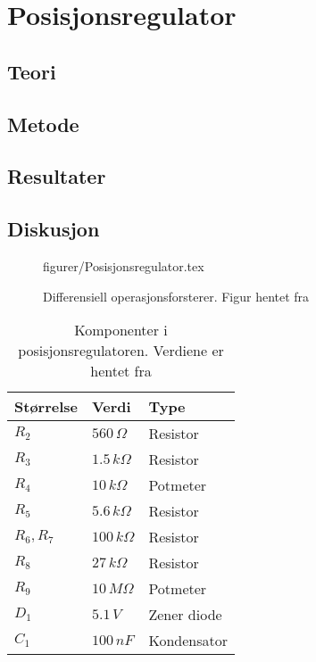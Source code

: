 \section{Posisjonsregulator}\label{sec:posisjonsregulator}

\subsection{Teori}




\subsection{Metode}

\subsection{Resultater}

\subsection{Diskusjon}

\begin{figure} [h]
     {figurer/Posisjonsregulator.tex}
    \caption{Differensiell operasjonsforsterer. Figur hentet fra \cite{AnalogMotorlabbOppgaver}}
    \label{fig:Posisjonsregulator}
\end{figure}

\begin{table}[b]
    \centering
    \caption{Komponenter i posisjonsregulatoren. Verdiene er hentet fra \cite{AnalogMotorlabbOppgaver}}
    \begin{tabular}{lll}
        \toprule
		Størrelse & Verdi & Type \\
		\midrule
        $R_2$ & $560\,\Omega$ & Resistor \\
        $R_3$ & $1.5\,k\Omega$ & Resistor\\
        $R_4$ & $10\,k\Omega$ & Potmeter\\
        $R_5$ & $5.6\,k\Omega$ & Resistor\\
        $R_6, R_7$ & $100\,k\Omega$ & Resistor\\
        $R_8$ & $27\,k\Omega$ & Resistor\\
        $R_9$ & $10\,M\Omega$ & Potmeter\\
        $D_1$ & $5.1\,V$ & Zener diode\\
        $C_1$ & $100\,nF$ & Kondensator\\
		\bottomrule
    \end{tabular}
    \label{tab:my_label}
\end{table}



